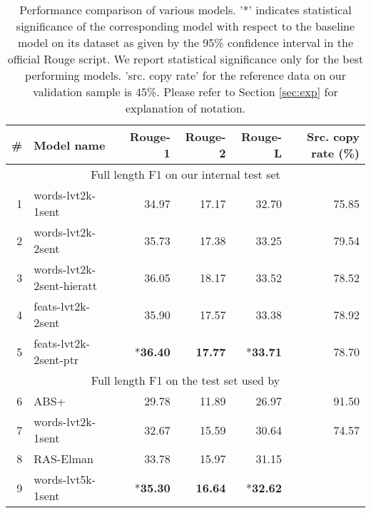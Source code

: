 \documentclass[11pt]{article}
\begin{document}
\begin{table*}
\begin{center}
{\small
\begin{tabular}{|r|l|r|r|r|r|}
\hline
{\bf \#} &  {\bf Model name} & {\bf Rouge-1} & {\bf Rouge-2} & {\bf Rouge-L} & {\bf Src. copy rate (\%)}\\
\hline


\hline





\hline
\hline
 \multicolumn{6}{|c|}{Full length F1 on our internal test set}  \\
\hline

1 & words-lvt2k-1sent      &    34.97              &    17.17                 &   32.70           &   75.85  \\
2 & words-lvt2k-2sent      &     35.73             &    17.38                 &   33.25           &    79.54 \\
3 & words-lvt2k-2sent-hieratt &   36.05          &    18.17                 &   33.52            &    78.52   \\
4 & feats-lvt2k-2sent             &   35.90           &    17.57                &   33.38         &      78.92          \\
5 & feats-lvt2k-2sent-ptr   &   *{\bf 36.40}            &    {\bf 17.77}                 &        *{\bf 33.71}   & 78.70  \\
\hline
\multicolumn{6}{|c|}{Full length F1 on the test set used by \cite{namas}}  \\
\hline
6 & ABS+ \cite{namas}  &    29.78      &      11.89             &     26.97        &   91.50       \\
7 & words-lvt2k-1sent & 32.67 &  15.59   & 30.64   &  74.57     \\
8 & RAS-Elman \cite{chopra} & 33.78 &  15.97  & 31.15 & \\
9 & words-lvt5k-1sent & *{\bf 35.30} & {\bf 16.64} & *{\bf 32.62} & \\
\hline
\end{tabular}
}
\end{center}
\vspace{-0.1in}
\caption{{\small Performance comparison of various models. '*' indicates statistical significance of the corresponding model with respect to the baseline model on its dataset as given by the 95\% confidence interval in the official Rouge script. We report statistical significance only for the best performing models. 'src. copy rate' for the reference data on our validation sample is 45\%. Please refer to Section \ref{sec:exp} for explanation of notation.}}
\label{tab:results}
\vspace{-0.2in}
\end{table*}
\end{document}
